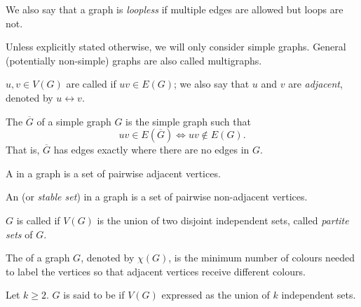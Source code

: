 We also say that a graph is \emph{loopless} if multiple edges are allowed but loops are not.

\begin{remark}
Unless explicitly stated otherwise, we will only consider simple graphs. General (potentially non-simple) graphs are also called multigraphs.
\end{remark}

\begin{definition}
$u,v\in V(G)$ are called  if $uv\in E(G)$; we also say that $u$ and $v$ are \emph{adjacent}, denoted by $u\leftrightarrow v$.
\end{definition}

\begin{definition}
The  $\overline{G}$ of a simple graph $G$ is the simple graph such that
\[uv\in E(\overline{G})\iff uv\notin E(G).\] 
That is, $\overline{G}$ has edges exactly where there are no edges in $G$.

A  in a graph is a set of pairwise adjacent vertices.

An  (or \emph{stable set}) in a graph is a set of pairwise non-adjacent vertices.
\end{definition}

\begin{definition}
$G$ is called  if $V(G)$ is the union of two disjoint independent sets, called \emph{partite sets} of $G$.

\end{definition}

\begin{definition}
The  of a graph $G$, denoted by $\chi(G)$, is the minimum number of colours needed to label the vertices so that adjacent vertices receive different colours.

Let $k\ge2$. $G$ is said to be  if $V(G)$ expressed as the union of $k$ independent sets.

\end{definition}

